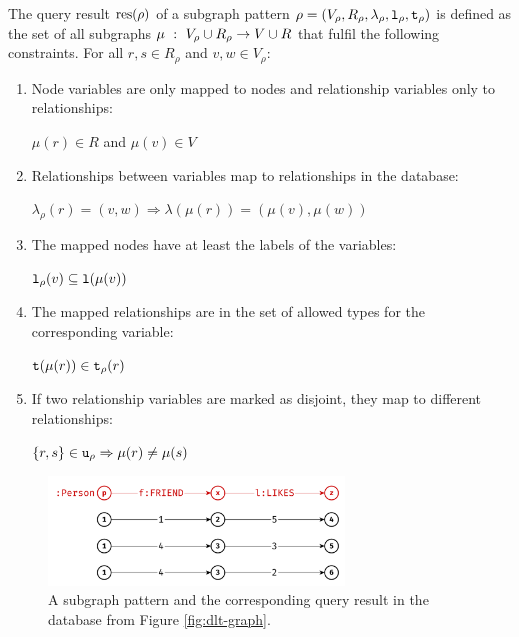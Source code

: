 \begin{definition}
\label{def:query-result}
The query result $\text{res}(\rho)$ of a subgraph pattern
$\rho = (V_\rho, R_\rho, \lambda_\rho, \texttt{l}_\rho, \texttt{t}_\rho)$ is defined
as the set of all subgraphs
$\mu ~:~ V_\rho \cup R_\rho \rightarrow V \cup R$ that fulfil the
following constraints. For all $r,s \in  R_\rho$ and $v, w \in V_\rho$:
\begin{enumerate}[(1)]
  \item Node variables are only mapped to nodes and relationship variables only to relationships:
  
    $\mu(r) \in R$ and $\mu(v) \in V$
  \item Relationships between variables map to relationships in the database:
  
    $\lambda_\rho(r) = (v, w) \Rightarrow \lambda(\mu(r)) = (\mu(v), \mu(w))$
    
  \item The mapped nodes have at least the labels of the variables:
  
    $\texttt{l}_\rho(v) \subseteq \texttt{l}(\mu(v))$
    
  \item The mapped relationships are in the set of allowed types for the corresponding variable:
  
    $\texttt{t}(\mu(r)) \in \texttt{t}_\rho(r)$
    
  \item If two relationship variables are marked as disjoint, they map to
    different relationships:
    
    $\{r,s\} \in \texttt{u}_\rho \Rightarrow \mu(r) \not = \mu(s)$
\end{enumerate}
\end{definition}

\begin{figure}
  \centering
  \includegraphics[width=0.7\textwidth]{figures/example-queries/person_p_friend_x_likes_z.pdf}
  \caption{A subgraph pattern and the corresponding query result in the
    database from Figure \ref{fig:dlt-graph}.}
  \label{fig:subgraph-pattern-1}
\end{figure}

